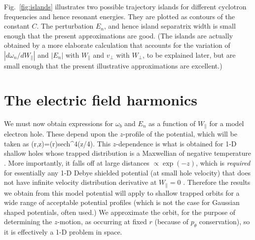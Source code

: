 \documentclass{agujournal2019}
\let\oldequation\equation
\let\oldendequation\endequation
\renewenvironment{equation}
  {\linenomathNonumbers\oldequation}
  {\oldendequation\endlinenomath}
\def\citep{\cite}
\begin{document}
Fig.\
\ref{fig:islands} illustrates two possible trajectory islands for
different cyclotron frequencies and hence resonant energies. They are
plotted as contours of the constant $C$.  The perturbation $E_n$, and
hence island separatrix width is small enough that the present
approximations are good. (The islands are actually obtained by a more
elaborate calculation that accounts for the variation of
$|d\omega_n/dW_\parallel|$ and $|E_n|$ with $W_\parallel$ and
$v_\perp$ with $W_\perp$, to be explained later, but are small enough
that the present illustrative approximations are excellent.)

\section{The electric field harmonics}

We must now obtain expressions for $\omega_b$ and $E_n$ as a function
of $W_\parallel$ for a model electron hole. These depend upon the
$z$-profile of the potential, which will be taken as
\begin{equation}
  \label{eq:phiofz}
  \phi(r,z)=\psi(r){\rm sech}^4(z/4).
\end{equation}
This $z$-dependence is what is obtained for 1-D shallow holes whose
trapped distribution is a Maxwellian of negative
temperature \citep{Schamel1979}. More importantly, it falls off at
large distances $\propto \exp(-z)$, which is \emph{required} for
essentially any 1-D Debye shielded potential (at small hole velocity)
that does not have infinite velocity distribution derivative at
$W_\parallel=0$ \citep{Hutchinson2017}. Therefore the results we obtain from this model
potential will apply to shallow trapped orbits for a wide range of
acceptable potential profiles (which is not the case for Gaussian
shaped potentials, often used.)  We approximate the orbit, for the
purpose of determining the $z$-motion, as occurring at fixed $r$
(because of $p_\theta$ conservation), so it is effectively a 1-D
problem in space.
\end{document}
